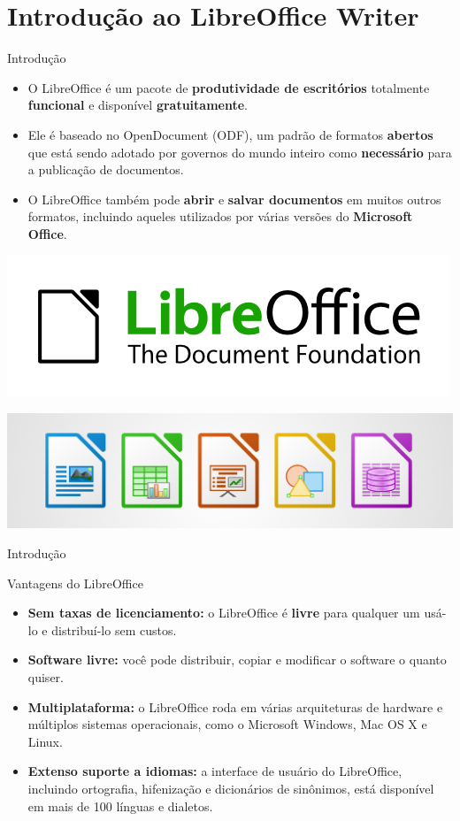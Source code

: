 \section{Introdução ao LibreOffice Writer}

\begin{frame}{Introdução}
	\begin{block}{}
		\begin{itemize}
			\item O LibreOffice é um pacote de \textbf{produtividade de escritórios} totalmente \textbf{funcional} e disponível \textbf{gratuitamente}.
			\item Ele é baseado no OpenDocument (ODF), um padrão de formatos \textbf{abertos} que está sendo adotado por governos do mundo inteiro como \textbf{necessário} para a publicação de documentos.
			\item O LibreOffice também pode \textbf{abrir} e \textbf{salvar documentos} em muitos outros formatos, incluindo aqueles utilizados por várias versões do \textbf{Microsoft Office}.
		\end{itemize}
	\end{block}

	\centering
	\includegraphics[width=0.45\linewidth]{Figuras/Ch04/fig1.2}

	\includegraphics[width=0.6\linewidth]{Figuras/Ch04/fig1.1}
\end{frame}


\begin{frame}{Introdução}
	\begin{block}{Vantagens do LibreOffice}
		\begin{itemize}
			\item \textbf{Sem taxas de licenciamento:} o LibreOffice é \textbf{livre} para qualquer um usá-lo e distribuí-lo sem custos.
			\item \textbf{Software livre:} você pode distribuir, copiar e modificar o software o quanto quiser.
			\item \textbf{Multiplataforma:} o LibreOffice roda em várias arquiteturas de hardware e múltiplos sistemas operacionais, como o Microsoft Windows, Mac OS X e Linux.
			\item \textbf{Extenso suporte a idiomas:} a interface de usuário do LibreOffice, incluindo ortografia, hifenização e dicionários de sinônimos, está disponível em mais de 100 línguas e dialetos.
		\end{itemize}
	\end{block}
\end{frame}


